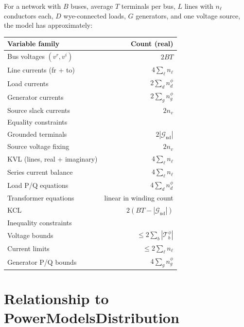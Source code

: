 \documentclass[11pt,a4paper]{article}
\newcommand{\mc}[1]{\mathcal{#1}}
\begin{document}
For a network with $B$ buses, average $T$ terminals per bus, $L$ lines with
$n_\ell$ conductors each, $D$ wye-connected loads, $G$ generators, and one
voltage source, the model has approximately:
%
\begin{center}
\renewcommand{\arraystretch}{1.2}
\begin{tabular}{@{}lr@{}}
\toprule
Variable family & Count (real) \\
\midrule
Bus voltages $(v^r, v^i)$ & $2 B T$ \\
Line currents (fr + to) & $4 \sum_\ell n_\ell$ \\
Load currents & $2 \sum_d n^\phi_d$ \\
Generator currents & $2 \sum_g n^\phi_g$ \\
Source slack currents & $2 n_v$ \\
\midrule
Equality constraints & \\
\quad Grounded terminals & $2|\mc{G}_\text{nd}|$ \\
\quad Source voltage fixing & $2 n_v$ \\
\quad KVL (lines, real + imaginary) & $4\sum_\ell n_\ell$ \\
\quad Series current balance & $4\sum_\ell n_\ell$ \\
\quad Load P/Q equations & $4\sum_d n^\phi_d$ \\
\quad Transformer equations & linear in winding count \\
\quad KCL & $2(BT - |\mc{G}_\text{nd}|)$ \\
Inequality constraints & \\
\quad Voltage bounds & $\leq 2\sum_b |\mc{T}^\phi_b|$ \\
\quad Current limits & $\leq 2\sum_\ell n_\ell$ \\
\quad Generator P/Q bounds & $4\sum_g n^\phi_g$ \\
\bottomrule
\end{tabular}
\end{center}

\section{Relationship to PowerModelsDistribution}
\end{document}
